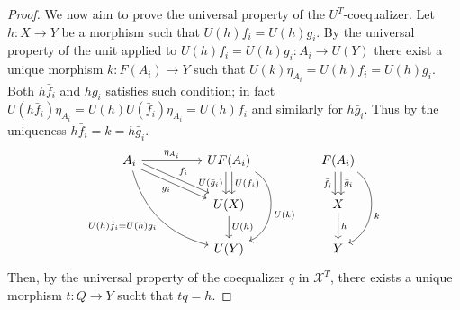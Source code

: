 \begin{subbox}{}
\begin{proof}
    We now aim to prove the universal property of the $U^T$-coequalizer. Let $h:X \to Y$ be a morphism such that $U(h)f_i=U(h)g_i$. By the universal property of the unit applied to $U(h)f_i=U(h)g_i : A_i \to U(Y)$ there exist a unique morphism $k:F(A_i) \to Y$ such that $U(k) \eta_{A_i}=U(h)f_i=U(h)g_i$. Both $h\bar{f}_i$ and
    $h\bar{g}_i$ satisfies such condition; in fact $U(h\bar{f}_i) \eta_{A_i}= U(h) U(\bar{f}_i) \eta_{A_i} = U(h)f_i$ and similarly for $h\bar{g}_i$. Thus by the uniqueness $h\bar{f}_i=k=h\bar{g}_i$.
    \[
\begin{tikzcd}
A_i \arrow[rrd, "f_i", shift left] \arrow[rrd, "g_i"', shift right] \arrow[rrdd, "U(h)f_i=U(h)g_i"', bend right] \arrow[rr, "\eta_{A_i}"] &  & UF(A_i) \arrow[d, "U(\bar{f}_i)", shift left] \arrow[d, "U(\bar{g}_i)"', shift right] \arrow[dd, "U(k)", bend left=67] &  & F(A_i) \arrow[d, "\bar{g}_i", shift left] \arrow[d, "\bar{f}_i"', shift right] \arrow[dd, "k", bend left=60] \\
                                                                                                                                          &  & U(X) \arrow[d, "U(h)"]                                                                                                 &  & X \arrow[d, "h"]                                                                                             \\
                                                                                                                                          &  & U(Y)                                                                                                                   &  & Y                                                                                                           
\end{tikzcd}
    \]
    Then, by the universal property of the coequalizer $q$ in $\mathcal{X}^T$, there exists a unique morphism $t:Q \to Y$ sucht that $tq=h$.
\end{proof}
\end{subbox}

